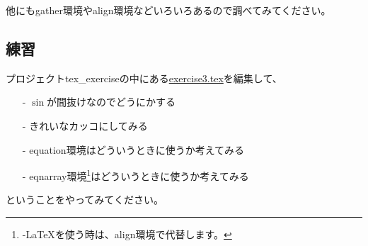 他にもgather環境やalign環境などいろいろあるので調べてみてください。

\subsection{練習}
プロジェクトtex\_exerciseの中にある\underline{exercise3.tex}を編集して、
\begin{itemize}
 \item[-] $\sin$が間抜けなのでどうにかする
 \item[-] きれいなカッコにしてみる
 \item[-] equation環境はどういうときに使うか考えてみる
 \item[-] eqnarray環境\footnote{{\AmS-\LaTeX}を使う時は、align環境で代替します。}はどういうときに使うか考えてみる
\end{itemize}
ということをやってみてください。

\pagebreak
